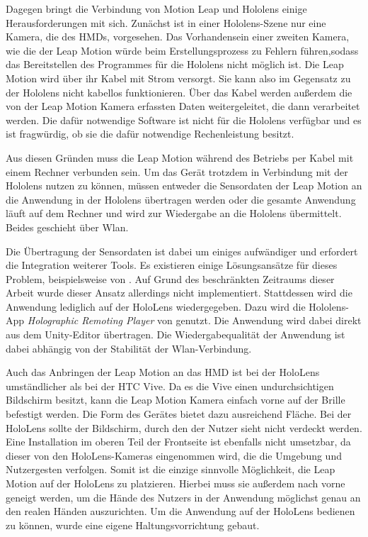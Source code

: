 Dagegen bringt die Verbindung von Motion Leap und Hololens einige Herausforderungen mit sich. Zunächst ist in einer Hololens-Szene nur eine Kamera, die des HMDs, vorgesehen. Das Vorhandensein einer zweiten Kamera, wie die der Leap Motion würde beim Erstellungsprozess zu Fehlern führen,sodass das Bereitstellen des Programmes für die Hololens nicht möglich ist.
Die Leap Motion wird über ihr Kabel mit Strom versorgt. Sie kann also im Gegensatz zu der Hololens nicht kabellos funktionieren. 
Über das Kabel werden außerdem die von der Leap Motion Kamera erfassten Daten weitergeleitet, die dann verarbeitet werden. Die dafür notwendige Software ist nicht für die Hololens verfügbar und es ist fragwürdig, ob sie die dafür notwendige Rechenleistung besitzt. 

Aus diesen Gründen muss die Leap Motion während des Betriebs per Kabel mit einem Rechner verbunden sein. Um das Gerät trotzdem in Verbindung mit der Hololens nutzen zu können, müssen entweder die Sensordaten der Leap Motion an die Anwendung in der Hololens übertragen werden oder die gesamte Anwendung läuft auf dem Rechner und wird zur Wiedergabe an die Hololens übermittelt. Beides geschieht über Wlan.

Die Übertragung der Sensordaten ist dabei um einiges aufwändiger und erfordert die Integration weiterer Tools. Es existieren einige Lösungsansätze für dieses Problem, beispielsweise von \citet{hololensGithub}. Auf Grund des beschränkten Zeitraums dieser Arbeit wurde dieser Ansatz allerdings nicht implementiert.
Stattdessen wird die Anwendung lediglich auf der HoloLens wiedergegeben. Dazu wird die Hololens-App \textit{Holographic Remoting Player} von \citet{remoteApp} genutzt. Die Anwendung wird dabei direkt aus dem Unity-Editor übertragen.
Die Wiedergabequalität der Anwendung ist dabei abhängig von der Stabilität der Wlan-Verbindung.

Auch das Anbringen der Leap Motion an das HMD ist bei der HoloLens umständlicher als bei der HTC Vive. 
Da es die Vive einen undurchsichtigen Bildschirm besitzt, kann die Leap Motion Kamera einfach vorne auf der Brille befestigt werden. Die Form des Gerätes bietet dazu ausreichend Fläche.
Bei der HoloLens sollte der Bildschirm, durch den der Nutzer sieht nicht verdeckt werden. Eine Installation  im oberen Teil der Frontseite ist ebenfalls nicht umsetzbar, da dieser von den HoloLens-Kameras eingenommen wird, die die Umgebung und Nutzergesten verfolgen.
Somit ist die einzige sinnvolle Möglichkeit, die Leap Motion auf der HoloLens zu platzieren. Hierbei muss sie außerdem nach vorne geneigt werden, um die Hände des Nutzers in der Anwendung möglichst genau an den realen Händen auszurichten. 
Um die Anwendung auf der HoloLens bedienen zu können, wurde eine eigene Haltungsvorrichtung gebaut.

